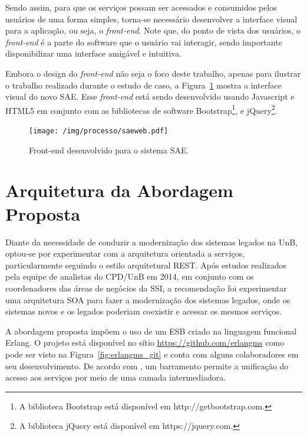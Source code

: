 Sendo assim, para que os serviços possam ser 
acessados e consumidos
pelos usuários de uma forma simples,
torna-se necessário desenvolver a
interface visual para a aplicação, ou seja, o \textit{front-end}.
Note que, do ponto de vista dos usuários,
o \textit{front-end} é a parte do software
que o usuário vai interagir, 
sendo importante
disponibilizar uma interface amigável e intuitiva.

Embora o design do \textit{front-end} 
não seja o foco deste trabalho,
apenas para ilustrar o trabalho realizado
durante o estudo de caso, a Figura~\ref{fig:frontend}
mostra a interface visual do novo \acrshort{SAE}.
Esse \textit{front-end} está sendo desenvolvido usando 
Javascript e HTML5 em conjunto com as bibliotecas
de software Bootstrap\footnote{A biblioteca Bootstrap está disponível em http://getbootstrap.com.}, e jQuery\footnote{A biblioteca jQuery está 
disponível em https://jquery.com.}.

\begin{figure}[htb]
\centering
\texttt{[image: /img/processo/saeweb.pdf]}
\caption{Front-end desenvolvido para o sistema SAE.}
\label{fig:frontend}
\end{figure}
\FloatBarrier


\section{Arquitetura da Abordagem Proposta}\label{visao_geral}\label{arquitetura}

Diante da necessidade de conduzir a modernização dos sistemas legados na \acrshort{UnB},
optou-se por experimentar com a arquitetura orientada a servi\c cos, particularmente 
seguindo o estilo arquitetural \acrshort{REST}. 
Após estudos realizados pela equipe de analistas do CPD/UnB em 2014, em conjunto com os 
coordenadores das áreas de negócios da \acrshort{SSI}, a recomendação foi experimentar uma arquitetura 
\acrshort{SOA} para fazer a modernização dos sistemas legados, onde os sistemas novos e os legados poderiam coexistir e acessar os mesmos serviços. 

A abordagem proposta impõem o uso de um \acrfull{ESB} criado na 
linguagem funcional Erlang. O projeto 
está disponível no sítio \url{https://github.com/erlangms}
como pode ser visto na Figura~\ref{fig:erlangms_git} e conta com alguns colaboradores em seu desenvolvimento. De acordo com \cite{SOAPractice:2007}, um barramento permite 
a unificação do acesso aos serviços por meio de uma camada intermediadora.


